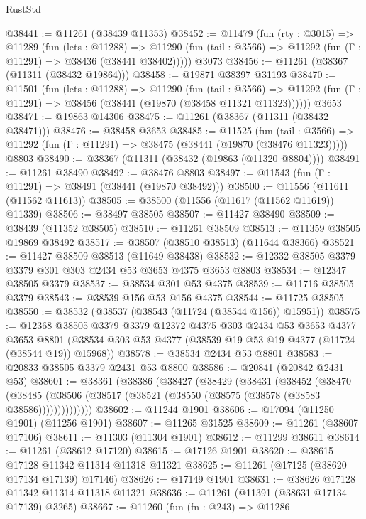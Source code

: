 \begin{lexlean}{RustStd}
\begin{coremodule}
@38441 := @11261 (@38439 @11353)
@38452 := @11479
    (fun (rty : @3015) =>
    @11289
      (fun (lets : @11288) =>
      @11290 (fun (tail : @3566) => @11292 (fun (Γ : @11291) => @38436 (@38441 @38402)))))
    @3073
@38456 := @11261 (@38367 (@11311 (@38432 @19864)))
@38458 := @19871 @38397 @31193
@38470 := @11501
    (fun (lets : @11288) =>
    @11290
      (fun (tail : @3566) =>
      @11292 (fun (Γ : @11291) => @38456 (@38441 (@19870 (@38458 @11321 @11323))))))
    @3653
@38471 := @19863 @14306
@38475 := @11261 (@38367 (@11311 (@38432 @38471)))
@38476 := @38458 @3653
@38485 := @11525
    (fun (tail : @3566) => @11292 (fun (Γ : @11291) => @38475 (@38441 (@19870 (@38476 @11323)))))
    @8803
@38490 := @38367 (@11311 (@38432 (@19863 (@11320 @8804))))
@38491 := @11261 @38490
@38492 := @38476 @8803
@38497 := @11543 (fun (Γ : @11291) => @38491 (@38441 (@19870 @38492)))
@38500 := @11556 (@11611 (@11562 @11613))
@38505 := @38500 (@11556 (@11617 (@11562 @11619)) @11339)
@38506 := @38497 @38505
@38507 := @11427 @38490
@38509 := @38439 (@11352 @38505)
@38510 := @11261 @38509
@38513 := @11359 @38505 @19869 @38492
@38517 := @38507 (@38510 @38513) (@11644 @38366)
@38521 := @11427 @38509 @38513 (@11649 @38438)
@38532 := @12332 @38505 @3379 @3379 @301 @303 @2434 @53 @3653 @4375 @3653 @8803
@38534 := @12347 @38505 @3379
@38537 := @38534 @301 @53 @4375
@38539 := @11716 @38505 @3379
@38543 := @38539 @156 @53 @156 @4375
@38544 := @11725 @38505
@38550 := @38532 (@38537 (@38543 (@11724 (@38544 @156)) @15951))
@38575 := @12368
    @38505
    @3379
    @3379
    @12372
    @4375
    @303
    @2434
    @53
    @3653
    @4377
    @3653
    @8801
    (@38534 @303 @53 @4377 (@38539 @19 @53 @19 @4377 (@11724 (@38544 @19)) @15968))
@38578 := @38534 @2434 @53 @8801
@38583 := @20833 @38505 @3379 @2431 @53 @8800
@38586 := @20841 (@20842 @2431 @53)
@38601 := @38361
    (@38386
      (@38427
        (@38429
          (@38431
            (@38452
              (@38470
                (@38485 (@38506 (@38517 (@38521 (@38550 (@38575 (@38578 (@38583 @38586))))))))))))))
@38602 := @11244 @1901
@38606 := @17094 (@11250 @1901) (@11256 @1901)
@38607 := @11265 @31525
@38609 := @11261 (@38607 @17106)
@38611 := @11303 (@11304 @1901)
@38612 := @11299 @38611
@38614 := @11261 (@38612 @17120)
@38615 := @17126 @1901
@38620 := @38615 @17128 @11342 @11314 @11318 @11321
@38625 := @11261 (@17125 (@38620 @17134 @17139) @17146)
@38626 := @17149 @1901
@38631 := @38626 @17128 @11342 @11314 @11318 @11321
@38636 := @11261 (@11391 (@38631 @17134 @17139) @3265)
@38667 := @11260
    (fun (fn : @243) =>
    @11286

\end{coremodule}
\end{lexlean}

